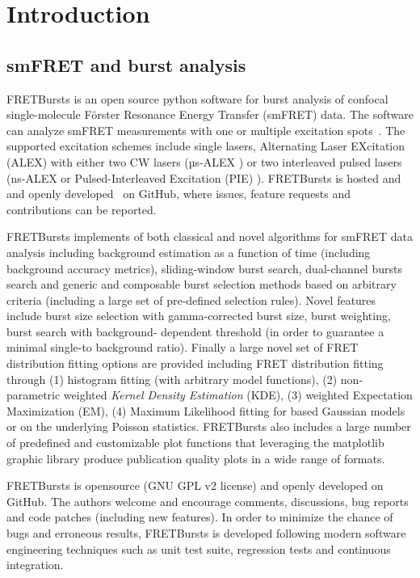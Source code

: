 \section{Introduction}

\subsection{smFRET and burst analysis}

FRETBursts is an open source python software for burst analysis of confocal 
single-molecule Förster Resonance Energy Transfer (smFRET) data. 
The software can analyze smFRET measurements
with one or multiple excitation spots~\cite{Ingargiola_2013}. The supported 
excitation schemes include single lasers, Alternating Laser EXcitation (ALEX) 
with either two CW lasers (µs-ALEX \cite{Kapanidis_2005}) 
or two interleaved pulsed lasers (ns-ALEX \cite{16287971} or 
Pulsed-Interleaved Excitation (PIE) \cite{M_ller_2005}). 
FRETBursts is hosted and and openly developed~\cite{Prli__2012} on GitHub, where
issues, feature requests and contributions can be reported.

FRETBursts implements of both classical and novel algorithms for smFRET data analysis 
including background estimation as a function of time (including background accuracy 
metrics), sliding-window burst search, dual-channel bursts search and
generic and composable burst selection methods based on arbitrary criteria 
(including a large set of pre-defined selection rules). Novel features include burst size
selection with gamma-corrected burst size, burst weighting, burst search with background-
dependent threshold (in order to guarantee a minimal single-to background ratio).
Finally a large novel set of FRET distribution fitting options are provided including
FRET distribution fitting through (1) histogram fitting (with arbitrary model functions), 
(2)  non-parametric weighted \textit{Kernel Density Estimation} (KDE), (3) weighted 
Expectation Maximization (EM), (4) Maximum Likelihood fitting for based Gaussian models 
or on the underlying Poisson statistics. FRETBursts also includes a large number of
predefined and customizable plot functions that leveraging the matplotlib graphic library
produce publication quality plots in a wide range of formats.

FRETBursts is opensource (GNU GPL v2 license) and openly developed on GitHub. 
The authors welcome and encourage comments, discussions, bug reports and code patches
(including new features).
In order to minimize the chance of bugs and erroneous results, FRETBursts is developed
following modern software engineering techniques such 
as unit test suite, regression tests and continuous integration.

